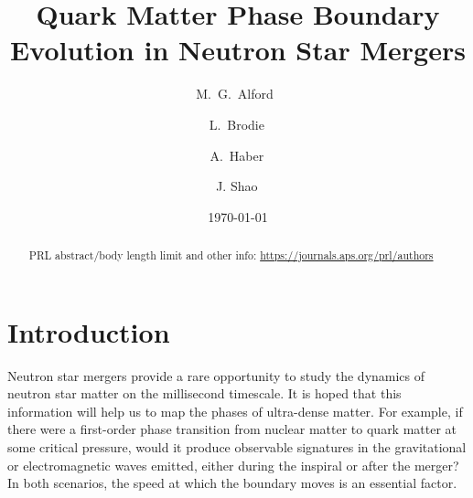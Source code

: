 \documentclass[10pt,superscriptaddress,
amsmath,aps,prl,twocolumn,nofootinbib]{revtex4-1}
\begin{document}
\title{Quark Matter Phase Boundary Evolution in Neutron Star Mergers}
 \author{M.~G.~Alford \,}
 \author{L.~Brodie\,}
 \author{A.~Haber\,}
 \author{J. Shao\,}

\date{\today}

\begin{abstract}
PRL abstract/body length limit and other info: \url{https://journals.aps.org/prl/authors}
\end{abstract}

\maketitle

\section{Introduction}

Neutron star mergers provide a rare opportunity to study the dynamics of neutron star matter on the millisecond timescale. It is hoped that this information will help us to map the phases of ultra-dense matter. For example, if there were a first-order phase transition from nuclear matter to quark matter at some critical pressure, would it produce observable signatures in the gravitational or electromagnetic waves emitted, either during the inspiral or after the merger? In both scenarios, the speed at which the boundary moves is an essential factor.
\end{document}
